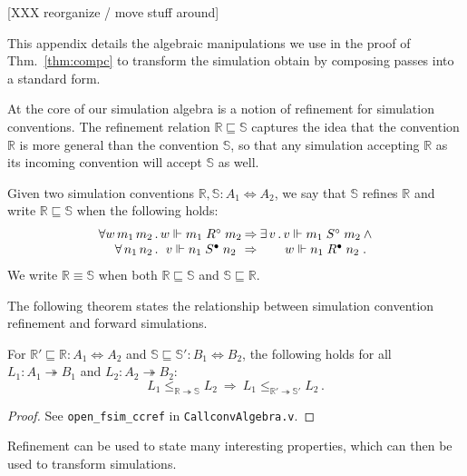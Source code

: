 \documentclass[acmsmall,authordraft]{acmart}
\newcommand{\que}{\circ}
\newcommand{\ans}{\bullet}
\newcommand{\scref}{\sqsubseteq}
\begin{document}
[XXX reorganize / move stuff around]

This appendix details
the algebraic manipulations we use
in the proof of Thm.~\ref{thm:compc}
to transform the simulation
obtain by composing passes
into a standard form.

At the core of our simulation algebra is
a notion of refinement for simulation conventions.
The refinement relation $\mathbb{R} \scref \mathbb{S}$
captures the idea that the convention $\mathbb{R}$
is more general than the convention $\mathbb{S}$,
so that any simulation accepting $\mathbb{R}$ as its
incoming convention will accept $\mathbb{S}$ as well.

\begin{definition} %
Given two simulation conventions
$\mathbb{R}, \mathbb{S} : A_1 \Leftrightarrow A_2$,
we say that
$\mathbb{S}$ refines $\mathbb{R}$ and write
$\mathbb{R} \scref \mathbb{S}$
when the following holds:
\[
    \begin{array}{r@{}c@{\:\Rightarrow\:}c@{}c@{}l}
      \forall w \, m_1 \, m_2 \,.\, &
      w \Vdash m_1 \mathrel{R^\que} m_2 &
      \exists \, v \,.\, &
      v \Vdash m_1 \mathrel{S^\que} m_2 &
      \: \wedge \\
      \forall \, n_1 \, n_2 \,.\, &
      v \Vdash n_1 \mathrel{S^\ans} n_2 &
      &
      w \Vdash n_1 \mathrel{R^\ans} n_2 & \,.
    \end{array}
\]
We write $\mathbb{R} \equiv \mathbb{S}$ when both
$\mathbb{R} \scref \mathbb{S}$ and
$\mathbb{S} \scref \mathbb{R}$.
\end{definition}

The following theorem states the relationship between
simulation convention refinement and forward simulations.

\begin{theorem} %
For
$\mathbb{R}' \scref \mathbb{R} : A_1 \Leftrightarrow A_2$ and
$\mathbb{S} \scref \mathbb{S}' : B_1 \Leftrightarrow B_2$,
the following holds for all
$L_1 : A_1 \twoheadrightarrow B_1$ and $L_2 : A_2 \twoheadrightarrow B_2$:
\[
      L_1 \le_{\mathbb{R} \twoheadrightarrow \mathbb{S}} L_2
      \: \Rightarrow \:
      L_1 \le_{\mathbb{R}' \twoheadrightarrow \mathbb{S}'} L_2 \,.
\]
\begin{proof}
See \texttt{open\_fsim\_ccref} in \texttt{CallconvAlgebra.v}.
\end{proof}
\end{theorem}

Refinement can be used to state many interesting properties,
which can then be used to transform simulations.
\end{document}
